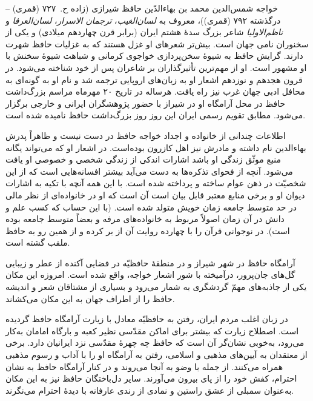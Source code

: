 خواجه شمس‌الدین محمد بن بهاءالدّین حافظ شیرازی 
(زاده ح.~۷۲۷ (قمری) -- درگذشته ۷۹۲ (قمری))،
معروف به {\em لسان‌الغیب}، {\em ترجمان الاسرار}، {\em لسان‌العرفا}
و {\em ناظم‌الاولیا} شاعر بزرگ سدهٔ هشتم ایران
(برابر قرن چهاردهم میلادی) و یکی از سخنوران نامی جهان است.
بیش‌تر شعرهای او غزل هستند که به غزلیات حافظ شهرت دارند.
گرایش حافظ به شیوهٔ سخن‌پردازی خواجوی کرمانی و
شباهت شیوهٔ سخنش با او مشهور است.
او از مهم‌ترین تأثیرگذاران بر شاعران پس از خود شناخته می‌شود.
در قرون هجدهم و نوزدهم اشعار او به زبان‌های اروپایی ترجمه شد
و نام او به گونه‌ای به محافل ادبی جهان غرب نیز راه یافت.
هرساله در تاریخ ۲۰ مهرماه مراسم بزرگ‌داشت حافظ در محل آرامگاه او در شیراز
با حضور پژوهشگران ایرانی و خارجی برگزار می‌شود.
مطابق تقویم رسمی ایران این روز روز بزرگ‌داشت حافظ نامیده شده است.

اطلاعات چندانی از خانواده و اجداد خواجه حافظ در دست نیست
و ظاهراً پدرش بهاءالدین نام داشته و مادرش نیز اهل کازرون بوده‌است.
در اشعار او که می‌تواند یگانه منبع موثّق زندگی او باشد
اشارات اندکی از زندگی شخصی و خصوصی او یافت می‌شود.
آنچه از فحوای تذکره‌ها به دست می‌آید بیشتر افسانه‌هایی است
که از این شخصیّت در ذهن عوام ساخته و پرداخته شده است.
با این همه آنچه با تکیه به اشارات دیوان او و برخی منابع معتبر
قابل بیان است آن است که او در خانواده‌ای از نظر مالی در حد متوسط
جامعه زمان خویش متولد شده است.
(با این حساب که کسب علم و دانش در آن زمان اصولاً
مربوط به خانواده‌های مرفه و بعضاً متوسط جامعه بوده است).
در نوجوانی قرآن را با چهارده روایت آن از بر کرده
و از همین رو به حافظ ملقب گشته است.

آرامگاه حافظ در شهر شیراز و در منطقهٔ حافظیّه در فضایی
آکنده از عطر و زیبایی گل‌های جان‌پرور، درآمیخته با شور
اشعار خواجه، واقع شده است. امروزه این مکان یکی از جاذبه‌های
مهمّ گردشگری به شمار می‌رود و بسیاری از مشتاقان شعر و اندیشه حافظ را
از اطراف جهان به این مکان می‌کشاند.

در زبان اغلب مردم ایران، رفتن به حافظیّه معادل با
زیارت آرامگاه حافظ گردیده است. اصطلاح زیارت که بیشتر
برای اماکن مقدّسی نظیر کعبه و بارگاه امامان به‌کار می‌رود،
به‌خوبی نشان‌گر آن است که حافظ چه چهرهٔ مقدّسی نزد ایرانیان دارد.
برخی از معتقدان به آیین‌های مذهبی و اسلامی، رفتن به آرامگاه او را
با آداب و رسوم مذهبی همراه می‌کنند. از جمله با وضو به آنجا می‌روند
و در کنار آرامگاه حافظ به نشان احترام، کفش خود را از پای بیرون می‌آورند.
سایر دل‌باختگان حافظ نیز به این مکان به‌عنوان سمبلی از عشق راستین
و نمادی از رندی عارفانه با دیدهٔ احترام می‌نگرند.
